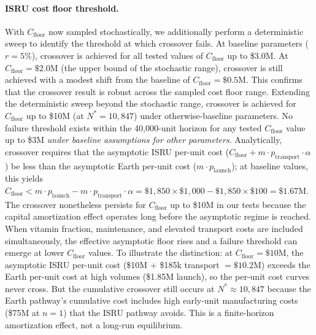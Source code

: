 \documentclass[preprint,12pt]{elsarticle}
\begin{document}
\paragraph{ISRU cost floor threshold.} With $C_{\mathrm{floor}}$ now sampled stochastically, we additionally perform a deterministic sweep to identify the threshold at which crossover fails. At baseline parameters ($r = 5\%$), crossover is achieved for all tested values of $C_{\mathrm{floor}}$ up to \$3.0M. At $C_{\mathrm{floor}} = \$2.0$M (the upper bound of the stochastic range), crossover is still achieved with a modest shift from the baseline of $C_{\mathrm{floor}} = \$0.5$M. This confirms that the crossover result is robust across the sampled cost floor range. Extending the deterministic sweep beyond the stochastic range, crossover is achieved for $C_{\mathrm{floor}}$ up to \$10M (at $N^* = 10{,}847$) under otherwise-baseline parameters. No failure threshold exists within the 40,000-unit horizon for any tested $C_{\mathrm{floor}}$ value up to \$3M \emph{under baseline assumptions for other parameters}. Analytically, crossover requires that the asymptotic ISRU per-unit cost ($C_{\mathrm{floor}} + m \cdot p_{\mathrm{transport}} \cdot \alpha$) be less than the asymptotic Earth per-unit cost ($m \cdot p_{\mathrm{launch}}$); at baseline values, this yields $C_{\mathrm{floor}} < m \cdot p_{\mathrm{launch}} - m \cdot p_{\mathrm{transport}} \cdot \alpha = \$1{,}850 \times \$1{,}000 - \$1{,}850 \times \$100 = \$1.67$M. The crossover nonetheless persists for $C_{\mathrm{floor}}$ up to \$10M in our tests because the capital amortization effect operates long before the asymptotic regime is reached. When vitamin fraction, maintenance, and elevated transport costs are included simultaneously, the effective asymptotic floor rises and a failure threshold can emerge at lower $C_{\mathrm{floor}}$ values. To illustrate the distinction: at $C_{\mathrm{floor}} = \$10$M, the asymptotic ISRU per-unit cost (\$10M + \$185k transport $= \$10.2$M) exceeds the Earth per-unit cost at high volumes (\$1.85M launch), so the per-unit cost curves never cross. But the cumulative crossover still occurs at $N^* \approx 10{,}847$ because the Earth pathway's cumulative cost includes high early-unit manufacturing costs (\$75M at $n = 1$) that the ISRU pathway avoids. This is a finite-horizon amortization effect, not a long-run equilibrium.
\end{document}
